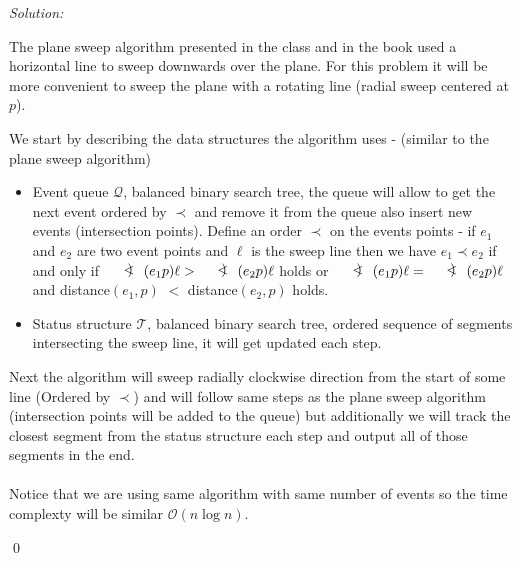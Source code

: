 \documentclass[a4paper, 8pt, oneside]{article}
\newcommand{\arcangle}{\mathord{\mathpalette\doarcangle\relax}}
\newcommand{\doarcangle}[2]{%
  \hbox{%
    \sbox0{$#1B$}%
    \sbox2{$#1<$}%
    \raisebox{\dimexpr\dp2+(\ht0-\ht2)/2}{%
      $#1<\mspace{-9mu}\mathrel{)}\mspace{2mu}$%
    }%
  }%
}
\newenvironment{sol}
    {\emph{Solution:}
    }
    {
    \qed
    }
\begin{document}
\begin{enumerate}
\begin{sol}
The plane sweep algorithm  presented in the class and in the book \cite[Chapter 2]{computationalbook} used a horizontal line to sweep downwards over the plane. For this problem it will be more convenient to sweep the plane with a rotating line (radial sweep centered at $p$).

We start by describing the data structures the algorithm uses - (similar to the plane sweep algorithm)
 \begin{itemize}
   \item Event queue $\mathcal{Q}$, balanced binary search tree, 
   the queue will allow to get the next event ordered by $\prec$ and remove it from the queue also insert new events (intersection points).
   Define an order $\prec$ on the events points - if $e_1$ and $e_2$ are two event points and $\ell$ is the sweep line then we have $e_1 \prec e_2$ if and only if $\arcangle (e_1 p) \ell > \arcangle (e_2 p) \ell$ holds or $\arcangle (e_1 p) \ell = \arcangle (e_2 p) \ell$ and distance$(e_1, p)$ $<$ distance$(e_2, p)$ holds.
  \item Status structure $\mathcal{T}$, balanced binary search tree, ordered sequence of segments intersecting the sweep line, it will get updated each step.
\end{itemize}
Next the algorithm will sweep radially clockwise direction from the start of some line (Ordered by $\prec$) and will follow same steps as the plane sweep algorithm (intersection points will be added to the queue) but additionally we will track the closest segment from the status structure each step and output all of those segments in the end.
\\ \\
Notice that we are using same algorithm with same number of events so the time complexty will be similar $\mathcal{O}(n\log{}n)$.
\end{sol}


\end{enumerate}
\end{document}
